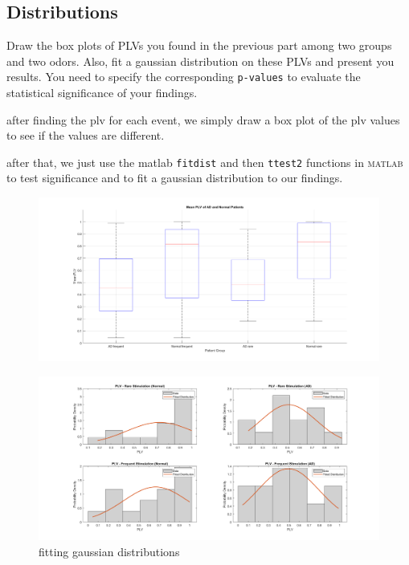 \documentclass[12pt]{article}
\begin{document}
\subsection{Distributions} Draw the box plots of PLVs you found in the previous part among two groups and two odors. Also, fit a gaussian distribution on these PLVs and present you results. You need to specify the corresponding \texttt{p-values} to evaluate the statistical significance of your findings.
\begin{qsolve}[]
	after finding the plv for each event, we simply draw a box plot of the plv values to see if the values are different.

	after that, we just use the matlab \texttt{fitdist} and then \texttt{ttest2} functions in \textsc{matlab} to test significance and to fit a gaussian distribution to our findings.
\end{qsolve}
\begin{figure}[h]
	\centering
	\includegraphics*[width=\linewidth]{../computation/PLV/result/boxplot.png}
\end{figure}
\begin{figure}[h]
	\centering
	\includegraphics*[width=\linewidth]{../computation/PLV/result/gaussian_fit.png}
	\caption{fitting gaussian distributions}
\end{figure}
\medskip
\end{document}
